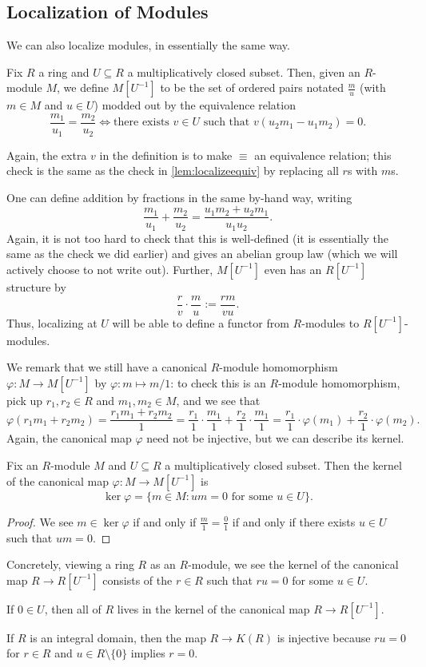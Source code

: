 \subsection{Localization of Modules}
We can also localize modules, in essentially the same way.
\begin{definition}
	Fix $R$ a ring and $U\subseteq R$ a multiplicatively closed subset. Then, given an $R$-module $M$, we define $M\left[U^{-1}\right]$ to be the set of ordered pairs notated $\frac mu$ (with $m\in M$ and $u\in U$) modded out by the equivalence relation
	\[\frac{m_1}{u_1}=\frac{m_2}{u_2}\iff\text{there exists }v\in U\text{ such that }v(u_2m_1-u_1m_2)=0.\]
\end{definition}
Again, the extra $v$ in the definition is to make $\equiv$ an equivalence relation; this check is the same as the check in \autoref{lem:localizeequiv} by replacing all $r$s with $m$s.

One can define addition by fractions in the same by-hand way, writing
\[\frac{m_1}{u_1}+\frac{m_2}{u_2}=\frac{u_1m_2+u_2m_1}{u_1u_2}.\]
Again, it is not too hard to check that this is well-defined (it is essentially the same as the check we did earlier) and gives an abelian group law (which we will actively choose to not write out). Further, $M\left[U^{-1}\right]$ even has an $R\left[U^{-1}\right]$ structure by
\[\frac rv\cdot\frac mu:=\frac{rm}{vu}.\]
Thus, localizing at $U$ will be able to define a functor from $R$-modules to $R\left[U^{-1}\right]$-modules.

We remark that we still have a canonical $R$-module homomorphism $\varphi:M\to M\left[U^{-1}\right]$ by $\varphi:m\mapsto m/1$: to check this is an $R$-module homomorphism, pick up $r_1,r_2\in R$ and $m_1,m_2\in M$, and we see that
\[\varphi(r_1m_1+r_2m_2)=\frac{r_1m_1+r_2m_2}1=\frac{r_1}1\cdot\frac{m_1}1+\frac{r_2}1\cdot\frac{m_1}1=\frac{r_1}1\cdot\varphi(m_1)+\frac{r_2}1\cdot\varphi(m_2).\]
Again, the canonical map $\varphi$ need not be injective, but we can describe its kernel.
\begin{lemma}
	Fix an $R$-module $M$ and $U\subseteq R$ a multiplicatively closed subset. Then the kernel of the canonical map $\varphi:M\to M\left[U^{-1}\right]$ is
	\[\ker\varphi=\{m\in M:um=0\text{ for some }u\in U\}.\]
\end{lemma}
\begin{proof}
	We see $m\in\ker\varphi$ if and only if $\frac m1=\frac01$ if and only if there exists $u\in U$ such that $um=0$.
\end{proof}
Concretely, viewing a ring $R$ as an $R$-module, we see the kernel of the canonical map $R\to R\left[U^{-1}\right]$ consists of the $r\in R$ such that $ru=0$ for some $u\in U$.
\begin{example}
	If $0\in U$, then all of $R$ lives in the kernel of the canonical map $R\to R\left[U^{-1}\right]$.
\end{example}
\begin{example} \label{ex:intdomainlocalinject}
	If $R$ is an integral domain, then the map $R\to K(R)$ is injective because $ru=0$ for $r\in R$ and $u\in R\setminus\{0\}$ implies $r=0$.
\end{example}

